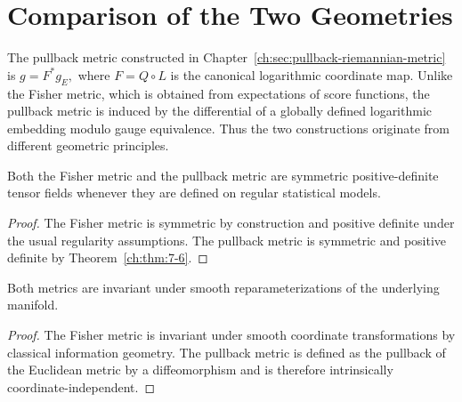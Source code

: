 \section{Comparison of the Two Geometries}\label{ch:sec:comparison-of-the-two-geometries}
The pullback metric constructed in Chapter~\ref{ch:sec:pullback-riemannian-metric} is
$g = F^{*}g_E,$
where
$F = Q\circ L$
is the canonical logarithmic coordinate map.
Unlike the Fisher metric, which is obtained from expectations of score
functions, the pullback metric is induced by the differential of a
globally defined logarithmic embedding modulo gauge equivalence.
Thus the two constructions originate from different geometric
principles.
\begin{proposition}
\label{ch:prop:10-1}
Both the Fisher metric and the pullback metric are symmetric
positive-definite tensor fields whenever they are defined on regular
statistical models.
\end{proposition}
\begin{proof}
The Fisher metric is symmetric by construction and positive definite
under the usual regularity assumptions.
The pullback metric is symmetric and positive definite by Theorem~\ref{ch:thm:7-6}.
\end{proof}

\begin{proposition}
\label{ch:prop:10-2}
Both metrics are invariant under smooth reparameterizations of the
underlying manifold.
\end{proposition}
\begin{proof}
The Fisher metric is invariant under smooth coordinate transformations
by classical information geometry.
The pullback metric is defined as the pullback of the Euclidean metric
by a diffeomorphism and is therefore intrinsically
coordinate-independent. 
\end{proof}

